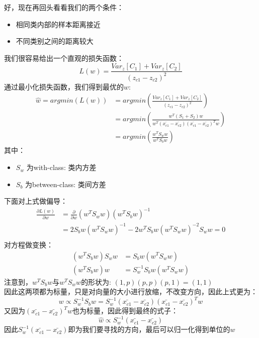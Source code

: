 \documentclass{report}
\begin{document}
好，现在再回头看看我们的两个条件：
\begin{itemize}
	\item 相同类内部的样本距离接近
	\item 不同类别之间的距离较大
\end{itemize}
我们很容易给出一个直观的损失函数：
$$
L(w)=\frac{Var_z[C_1]+Var_z[C_2]}{(z_{c1}-z_{c2})^2}
$$
通过最小化损失函数，我们得到最优的$w$:
\begin{equation}
\begin{aligned}
\hat{w}=argmin(L(w))&=argmin(\frac{Var_z[C_1]+Var_z[C_2]}{(z_{c1}-z_{c2})^2})\\
&=argmin(\frac{w^T(S_1+S_2)w}{w^T(\bar{x_{c1}}-\bar{x_{c2}})(\bar{x_{c1}}-\bar{x_{c2}})^T w})\\
&=argmin(\frac{w^T S_w w}{w^T S_b w})
\end{aligned}
\end{equation}
其中：
\begin{itemize}
	\item $S_w$ 为with-class: 类内方差
	\item $S_b$ 为between-class: 类间方差
\end{itemize}
下面对上式做偏导：
$$
\begin{aligned}
\frac{\partial{L(w)}}{\partial{w}}&=\frac{\partial}{\partial{w}}(w^T S_w w)(w^T S_b w)^{-1}\\
&=2 S_{b} w\left(w^{T} S_{w} w\right)^{-1}-2 w^{T} S_{b} w\left(w^{T} S_{w} w\right)^{-2} S_{w} w=0\\
\end{aligned}
$$
对方程做变换：
$$
\begin{aligned}
\left(w^{T} S_{b} w\right) S_{w} w&=S_{b} w\left(w^{T} S_{w} w\right)\\
\left(w^{T} S_{b} w\right) w&=S_{w}^{-1}S_{b} w\left(w^{T} S_{w} w\right)
\end{aligned}
$$
注意到，$w^T S_b w$与$w^T S_w w$的形状为: $(1,p) (p,p) (p,1)=(1,1)$\\
因此这两项都为标量，只是对向量的大小进行放缩，不改变方向，因此上式更为：
$$
w \propto S_{w}^{-1} S_{b} w=S_{w}^{-1}\left(\bar{x_{c 1}}-\bar{x_{c 2}}\right)\left(\bar{x_{c 1}}-\bar{x_{c 2}}\right)^{T} w 
$$
又因为$\left(\bar{x_{c 1}}-\bar{x_{c 2}}\right)^{T} w$也为标量，因此得到最终的式子：
$$
\hat{w}\propto S_{w}^{-1}\left(\bar{x_{c 1}}-\bar{x_{c 2}}\right)
$$
因此$S_{w}^{-1}\left(\bar{x_{c 1}}-\bar{x_{c 2}}\right)$即为我们要寻找的方向，最后可以归一化得到单位的$w$
\end{document}
